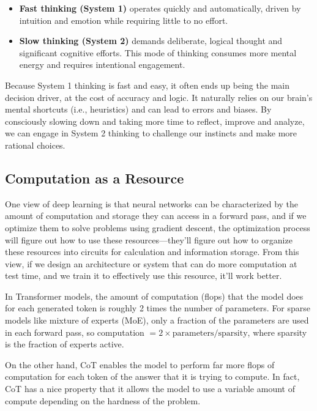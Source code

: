 \documentclass[12pt]{article}
\begin{document}
\begin{itemize}
    \item \textbf{Fast thinking (System 1)} operates quickly and automatically, driven by intuition and emotion while requiring little to no effort.
    \item \textbf{Slow thinking (System 2)} demands deliberate, logical thought and significant cognitive efforts. This mode of thinking consumes more mental energy and requires intentional engagement.
\end{itemize}

Because System 1 thinking is fast and easy, it often ends up being the main decision driver, at the cost of accuracy and logic. It naturally relies on our brain’s mental shortcuts (i.e., heuristics) and can lead to errors and biases. By consciously slowing down and taking more time to reflect, improve and analyze, we can engage in System 2 thinking to challenge our instincts and make more rational choices.

\subsection{Computation as a Resource}

One view of deep learning is that neural networks can be characterized by the amount of computation and storage they can access in a forward pass, and if we optimize them to solve problems using gradient descent, the optimization process will figure out how to use these resources---they’ll figure out how to organize these resources into circuits for calculation and information storage. From this view, if we design an architecture or system that can do more computation at test time, and we train it to effectively use this resource, it’ll work better.

In Transformer models, the amount of computation (flops) that the model does for each generated token is roughly 2 times the number of parameters. For sparse models like mixture of experts (MoE), only a fraction of the parameters are used in each forward pass, so computation $= 2 \times \text{parameters} / \text{sparsity}$, where sparsity is the fraction of experts active.

On the other hand, CoT enables the model to perform far more flops of computation for each token of the answer that it is trying to compute. In fact, CoT has a nice property that it allows the model to use a variable amount of compute depending on the hardness of the problem.
\end{document}
